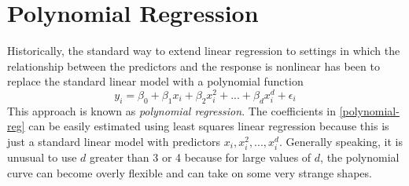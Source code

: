 \section{Polynomial Regression}
Historically, the standard way to extend linear regression to settings in which the relationship between the predictors and the response is nonlinear has been to replace the standard linear model with a polynomial function
\begin{equation}
    y_i = \beta_0 + \beta_1x_i + \beta_2x_i^2 + ... + \beta_dx_i^d + \epsilon_i
    \label{polynomial-reg}
\end{equation}
This approach is known as \textit{polynomial regression}. The coefficients in \ref{polynomial-reg} can be easily estimated using least squares linear regression because this is just a standard linear model with predictors $x_i, x_i^2, ..., x_i^d$. Generally speaking, it is unusual to use $d$ greater than 3 or 4 because for large values of $d$, the polynomial curve can become overly flexible and can take on some very strange shapes.

